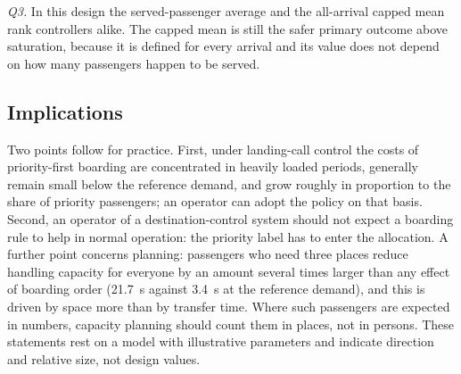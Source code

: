 \documentclass[12pt,a4paper]{article}
\begin{document}
\emph{Q3.} In this design the served-passenger average and the all-arrival capped mean rank controllers alike. The capped mean is still the safer primary outcome above saturation, because it is defined for every arrival and its value does not depend on how many passengers happen to be served.

\subsection{Implications}
Two points follow for practice. First, under landing-call control the costs of priority-first boarding are concentrated in heavily loaded periods, generally remain small below the reference demand, and grow roughly in proportion to the share of priority passengers; an operator can adopt the policy on that basis. Second, an operator of a destination-control system should not expect a boarding rule to help in normal operation: the priority label has to enter the allocation. A further point concerns planning: passengers who need three places reduce handling capacity for everyone by an amount several times larger than any effect of boarding order (21.7~s against 3.4~s at the reference demand), and this is driven by space more than by transfer time. Where such passengers are expected in numbers, capacity planning should count them in places, not in persons. These statements rest on a model with illustrative parameters and indicate direction and relative size, not design values.
\end{document}
